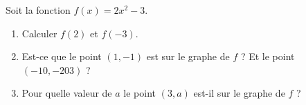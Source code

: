 
\begin{exercice}\label{exosmath-0298}

    Soit la fonction \( f(x)=2x^2-3\).
    \begin{enumerate}
        \item
            Calculer \( f(2)\) et \( f(-3)\).
        \item
            Est-ce que le point \( (1,-1)\) est sur le graphe de \( f\) ? Et le point \( (-10,-203)\) ?
        \item
            Pour quelle valeur de \( a\) le point \( (3,a)\) est-il sur le graphe de \( f\) ?
    \end{enumerate}

\end{exercice}
